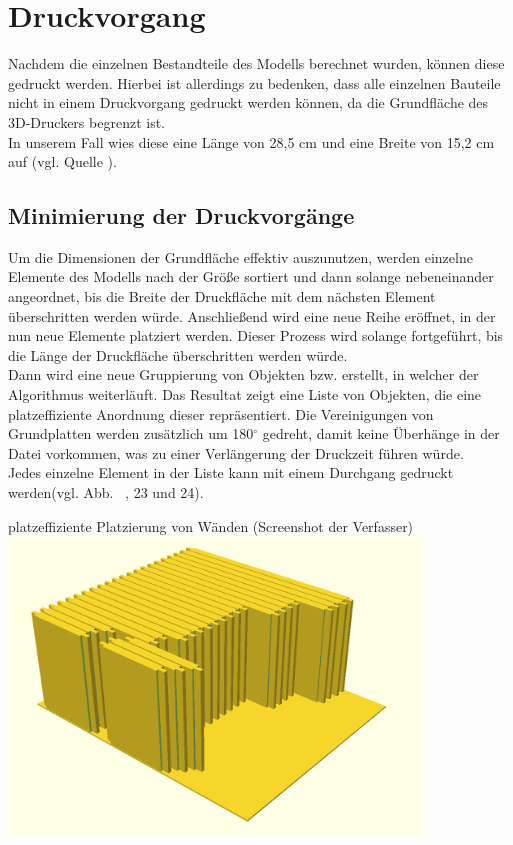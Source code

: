 \section{Druckvorgang}
Nachdem die einzelnen Bestandteile des Modells berechnet wurden, können diese gedruckt werden.
Hierbei ist allerdings zu bedenken, dass alle einzelnen Bauteile nicht in einem Druckvorgang gedruckt werden können, da die Grundfläche des 3D-Druckers begrenzt ist. \\
In unserem Fall wies diese eine Länge von 28,5 cm und eine Breite von 15,2 cm auf (vgl. Quelle \cite{makerbotspecs}).

\subsection{Minimierung der Druckvorgänge}
Um die Dimensionen der Grundfläche effektiv auszunutzen, werden einzelne Elemente des Modells nach der Größe sortiert und dann solange nebeneinander angeordnet, bis die Breite der Druckfläche mit dem nächsten Element überschritten werden würde.
Anschließend wird eine neue Reihe eröffnet, in der nun neue Elemente platziert werden. 
Dieser Prozess wird solange fortgeführt, bis die Länge der Druckfläche überschritten werden würde. \\
Dann wird eine neue Gruppierung von Objekten bzw.  erstellt, in welcher der Algorithmus weiterläuft.
Das Resultat zeigt eine Liste von Objekten, die eine platzeffiziente Anordnung dieser repräsentiert.
Die Vereinigungen von Grundplatten werden zusätzlich um 180$^\circ$ gedreht, damit keine Überhänge in der Datei vorkommen, was zu einer Verlängerung der Druckzeit führen würde.\\
Jedes einzelne Element in der Liste kann mit einem Durchgang gedruckt werden(vgl. Abb.~ \thebildnrnext, 23 und 24).

\begin{Bild}{platzeffiziente Platzierung von Wänden (Screenshot der Verfasser)}
	\includegraphics[width = 110mm]{Bilder/WallPlacement}
\end{Bild}

